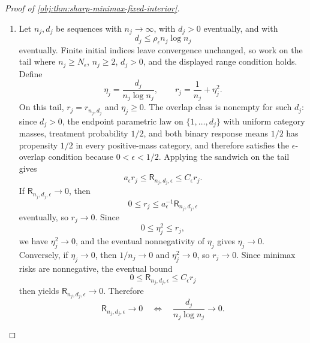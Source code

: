 \documentclass[11pt]{article}
\begin{document}
\begin{proof}[Proof of \cref{obj:thm:sharp-minimax-fixed-interior}]
\begin{enumerate}
\item Let \(n_j,d_j\) be sequences with \(n_j\to\infty\), with \(d_j>0\) eventually, and with
\[
d_j\le\rho_\epsilon n_j\log n_j
\]
eventually.  Finite initial indices leave convergence unchanged, so work on the tail where
\(n_j\ge N_\epsilon\), \(n_j\ge2\), \(d_j>0\), and the displayed range condition holds.  Define
\[
\eta_j=\frac{d_j}{n_j\log n_j},
\qquad
r_j=\frac1{n_j}+\eta_j^2.
\]
On this tail, \(r_j=r_{n_j,d_j}\) and \(\eta_j\ge0\).  The overlap class is nonempty for
such \(d_j\): since \(d_j>0\), the endpoint parametric law on \(\{1,\ldots,d_j\}\) with
uniform category masses, treatment probability \(1/2\), and both binary response means
\(1/2\) has propensity \(1/2\) in every positive-mass category, and therefore satisfies the
\(\epsilon\)-overlap condition because \(0<\epsilon<1/2\).  Applying the sandwich on the tail
gives
\[
a_\epsilon r_j
\le
\mathsf R_{n_j,d_j,\epsilon}
\le
C_\epsilon r_j .
\]
If \(\mathsf R_{n_j,d_j,\epsilon}\to0\), then
\[
0\le r_j\le a_\epsilon^{-1}\mathsf R_{n_j,d_j,\epsilon}
\]
eventually, so \(r_j\to0\).  Since
\[
0\le \eta_j^2\le r_j,
\]
we have \(\eta_j^2\to0\), and the eventual nonnegativity of \(\eta_j\) gives
\(\eta_j\to0\).  Conversely, if \(\eta_j\to0\), then \(1/n_j\to0\) and
\(\eta_j^2\to0\), so \(r_j\to0\).  Since minimax risks are nonnegative, the eventual bound
\[
0\le
\mathsf R_{n_j,d_j,\epsilon}
\le
C_\epsilon r_j
\]
then yields \(\mathsf R_{n_j,d_j,\epsilon}\to0\).  Therefore
\[
\mathsf R_{n_j,d_j,\epsilon}\to0
\quad\Longleftrightarrow\quad
\frac{d_j}{n_j\log n_j}\to0 .
\]
\end{enumerate}
\end{proof}
\end{document}
